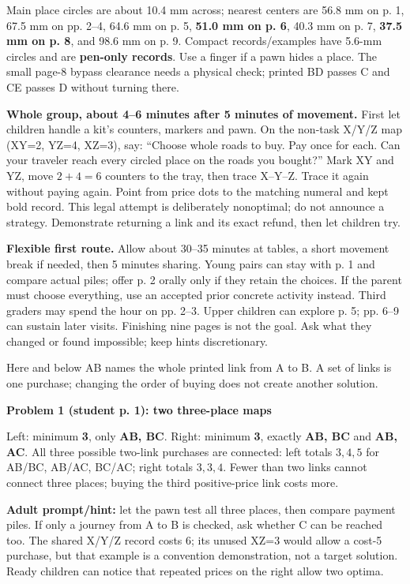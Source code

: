 \documentclass[11pt,letterpaper]{article}
\newcommand\topic[1]{\par\vspace{5pt}{\large\bfseries #1}\par}
\newcommand\task[2]{\par\vspace{3pt}\textbf{Problem #1 (student p. #1): #2}\par}
\begin{document}
Main place circles are about 10.4 mm across; nearest centers are 56.8 mm on p. 1, 67.5 mm on pp. 2--4, 64.6 mm on p. 5, \textbf{51.0 mm on p. 6}, 40.3 mm on p. 7, \textbf{37.5 mm on p. 8}, and 98.6 mm on p. 9. Compact records/examples have 5.6-mm circles and are \textbf{pen-only records}. Use a finger if a pawn hides a place. The small page-8 bypass clearance needs a physical check; printed BD passes C and CE passes D without turning there.

\textbf{Whole group, about 4--6 minutes after 5 minutes of movement.} First let children handle a kit's counters, markers and pawn. On the non-task X/Y/Z map (XY=2, YZ=4, XZ=3), say: ``Choose whole roads to buy. Pay once for each. Can your traveler reach every circled place on the roads you bought?'' Mark XY and YZ, move $2+4=6$ counters to the tray, then trace X--Y--Z. Trace it again without paying again. Point from price dots to the matching numeral and kept bold record. This legal attempt is deliberately nonoptimal; do not announce a strategy. Demonstrate returning a link and its exact refund, then let children try.

\textbf{Flexible first route.} Allow about 30--35 minutes at tables, a short movement break if needed, then 5 minutes sharing. Young pairs can stay with p. 1 and compare actual piles; offer p. 2 orally only if they retain the choices. If the parent must choose everything, use an accepted prior concrete activity instead. Third graders may spend the hour on pp. 2--3. Upper children can explore p. 5; pp. 6--9 can sustain later visits. Finishing nine pages is not the goal. Ask what they changed or found impossible; keep hints discretionary.
\newpage

\topic{Complete small-map keys: Problems 1--4}
Here and below AB names the whole printed link from A to B. A set of links is one purchase; changing the order of buying does not create another solution.

\task{1}{two three-place maps}
Left: minimum \textbf{3}, only \textbf{AB, BC}. Right: minimum \textbf{3}, exactly \textbf{AB, BC} and \textbf{AB, AC}. All three possible two-link purchases are connected: left totals $3,4,5$ for AB/BC, AB/AC, BC/AC; right totals $3,3,4$. Fewer than two links cannot connect three places; buying the third positive-price link costs more.

\textbf{Adult prompt/hint:} let the pawn test all three places, then compare payment piles. If only a journey from A to B is checked, ask whether C can be reached too. The shared X/Y/Z record costs 6; its unused XZ=3 would allow a cost-5 purchase, but that example is a convention demonstration, not a target solution. Ready children can notice that repeated prices on the right allow two optima.
\end{document}
